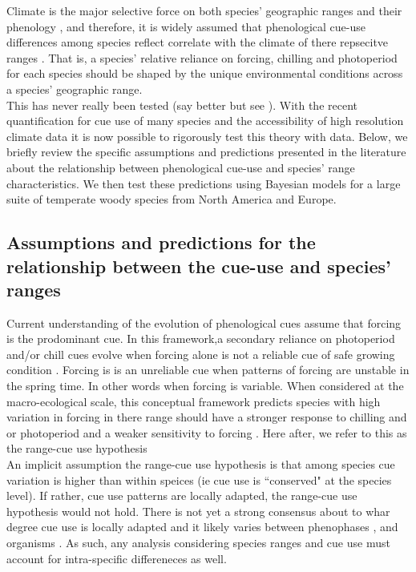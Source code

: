 \documentclass[12pt]{article}\usepackage[]{graphicx}\usepackage[]{color}
\begin{document}
Climate is the major selective force on both species' geographic ranges \citep{} and their phenology \citep{}, and therefore, it is widely assumed that phenological cue-use differences among species reflect correlate with the climate of there repsecitve ranges \citep{}. That is, a species' relative reliance on forcing, chilling and photoperiod for each species should be shaped by the unique environmental conditions across a species' geographic range.\\

This has never really been tested (say better but see \citep{Zohner:2017aa}). With the recent quantification for cue use of many species \citep{} and the accessibility of high resolution climate data it is now possible to rigorously test this theory with data. Below, we briefly review the specific assumptions and predictions presented in the literature about the relationship between phenological cue-use and species' range characteristics. We then test these predictions using Bayesian models for a large suite of temperate woody species from North America and Europe.


\subsection*{Assumptions and predictions for the relationship between the cue-use and species' ranges}

Current understanding of the evolution of phenological cues assume that forcing is the prodominant cue. In this framework,a secondary reliance on photoperiod and/or chill cues evolve when forcing alone is not a reliable cue of safe growing condition \citep{Korner:2010aa}. Forcing is is an unreliable cue when patterns of forcing are unstable in the spring time. In other words when forcing is variable. When considered at the macro-ecological scale, this conceptual framework predicts species with high variation in forcing in there range should have a stronger response to chilling and or photoperiod and a weaker sensitivity to forcing \citep{Wang:2014aa, Muffler2016}. Here after, we refer to this as the range-cue use hypothesis\\

An implicit assumption the range-cue use hypothesis is that among species cue variation is higher than within speices (ie cue use is ``conserved" at the species level). If rather, cue use patterns are locally adapted, the range-cue use hypothesis would not hold. There is not yet a strong consensus about to whar degree cue use is locally adapted and it likely varies between phenophases \citep{}, and organisms \citep{}. As such, any analysis considering species ranges and cue use must account for intra-specific differeneces as well.
\end{document}
